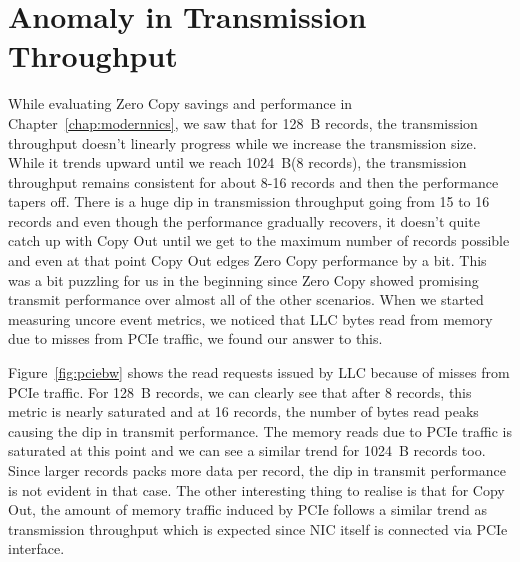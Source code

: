 \section{Anomaly in Transmission Throughput}
While evaluating Zero Copy savings and performance in Chapter~\ref{chap:modernnics}, we saw that for 128~B records, the transmission throughput doesn't linearly progress 
while we increase the transmission size. While it trends upward until we reach 1024~B(8 records), the transmission throughput remains consistent for about 8-16 records and 
then the performance tapers off. There is a huge dip in transmission throughput going from 15 to 16 records and even though the performance gradually recovers, it doesn't quite 
catch up with Copy Out until we get to the maximum number of records possible and even at that point Copy Out edges Zero Copy performance by a bit. This was a bit puzzling 
for us in the beginning since Zero Copy showed promising transmit performance over almost all of the other scenarios. When we started measuring uncore event metrics, we noticed 
that LLC bytes read from memory due to misses from PCIe traffic, we found our answer to this.



Figure~\ref{fig:pciebw} shows the read requests issued by LLC because of misses from PCIe traffic. For 128~B records, we can clearly see that after 8 records, this metric is 
nearly saturated and at 16 records, the number of bytes read peaks causing the dip in transmit performance. The memory reads due to PCIe traffic is saturated at this point and 
we can see a similar trend for 1024~B records too. Since larger records packs more data per record, the dip in transmit performance is not evident in that case. The other interesting 
thing to realise is that for Copy Out, the amount of memory traffic induced by PCIe follows a similar trend as transmission throughput which is expected since 
NIC itself is connected via PCIe interface.

